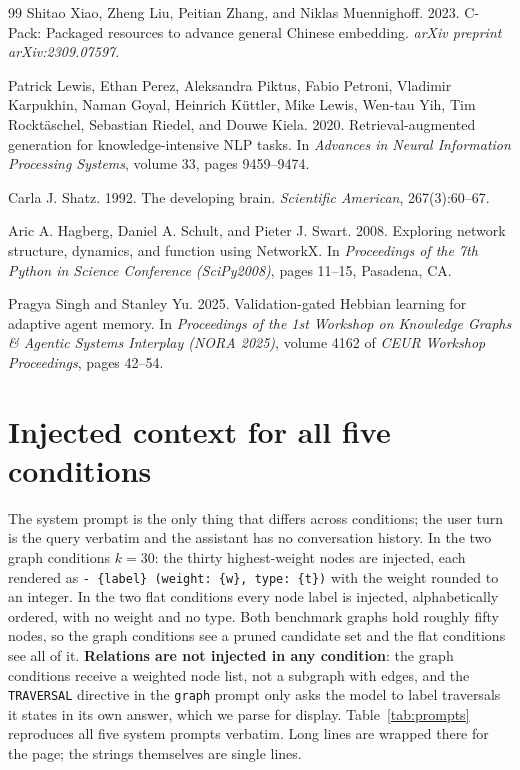 \documentclass[11pt]{article}
\begin{document}
\begin{thebibliography}{99}
Shitao Xiao, Zheng Liu, Peitian Zhang, and Niklas Muennighoff. 2023.
\newblock C-Pack: Packaged resources to advance general Chinese embedding.
\newblock \emph{arXiv preprint arXiv:2309.07597}.

Patrick Lewis, Ethan Perez, Aleksandra Piktus, Fabio Petroni, Vladimir Karpukhin, Naman Goyal, Heinrich K\"uttler, Mike Lewis, Wen-tau Yih, Tim Rockt\"aschel, Sebastian Riedel, and Douwe Kiela. 2020.
\newblock Retrieval-augmented generation for knowledge-intensive NLP tasks.
\newblock In \emph{Advances in Neural Information Processing Systems}, volume 33, pages 9459--9474.

Carla J. Shatz. 1992.
\newblock The developing brain.
\newblock \emph{Scientific American}, 267(3):60--67.

Aric A. Hagberg, Daniel A. Schult, and Pieter J. Swart. 2008.
\newblock Exploring network structure, dynamics, and function using NetworkX.
\newblock In \emph{Proceedings of the 7th Python in Science Conference (SciPy2008)}, pages 11--15, Pasadena, CA.

Pragya Singh and Stanley Yu. 2025.
\newblock Validation-gated {H}ebbian learning for adaptive agent memory.
\newblock In \emph{Proceedings of the 1st Workshop on Knowledge Graphs \& Agentic Systems Interplay (NORA 2025)}, volume 4162 of \emph{CEUR Workshop Proceedings}, pages 42--54.

\end{thebibliography}

\appendix

\section{Injected context for all five conditions}
\label{app:prompts}

The system prompt is the only thing that differs across conditions; the user turn is the
query verbatim and the assistant has no conversation history. In the two graph conditions
$k=30$: the thirty highest-weight nodes are injected, each rendered as
\texttt{- \{label\} (weight: \{w\}, type: \{t\})} with the weight rounded to an integer.
In the two flat conditions every node label is injected, alphabetically ordered, with no
weight and no type. Both benchmark graphs hold roughly fifty nodes, so the graph conditions
see a pruned candidate set and the flat conditions see all of it. \textbf{Relations are not
injected in any condition}: the graph conditions receive a weighted node list, not a
subgraph with edges, and the \texttt{TRAVERSAL} directive in the \texttt{graph} prompt only
asks the model to label traversals it states in its own answer, which we parse for display.
Table~\ref{tab:prompts} reproduces all five system prompts verbatim. Long lines are
wrapped there for the page; the strings themselves are single lines.
\end{document}
